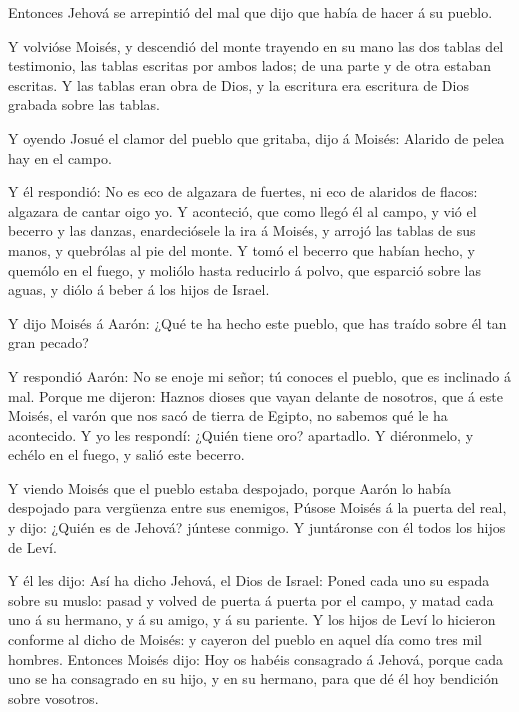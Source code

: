  Entonces Jehová se arrepintió del mal que dijo que había
de hacer á su pueblo.

 Y volvióse Moisés, y descendió del monte trayendo en su
mano las dos tablas del testimonio, las tablas escritas por ambos lados;
de una parte y de otra estaban escritas.  Y las tablas eran
obra de Dios, y la escritura era escritura de Dios grabada sobre las
tablas.

 Y oyendo Josué el clamor del pueblo que gritaba, dijo á
Moisés: Alarido de pelea hay en el campo.

 Y él respondió: No es eco de algazara de fuertes, ni eco
de alaridos de flacos: algazara de cantar oigo yo.  Y
aconteció, que como llegó él al campo, y vió el becerro y las danzas,
enardeciósele la ira á Moisés, y arrojó las tablas de sus manos, y
quebrólas al pie del monte.  Y tomó el becerro que habían
hecho, y quemólo en el fuego, y moliólo hasta reducirlo á polvo, que
esparció sobre las aguas, y diólo á beber á los hijos de Israel.

 Y dijo Moisés á Aarón: ¿Qué te ha hecho este pueblo, que
has traído sobre él tan gran pecado?

 Y respondió Aarón: No se enoje mi señor; tú conoces el
pueblo, que es inclinado á mal.  Porque me dijeron: Haznos
dioses que vayan delante de nosotros, que á este Moisés, el varón que
nos sacó de tierra de Egipto, no sabemos qué le ha acontecido.
 Y yo les respondí: ¿Quién tiene oro? apartadlo. Y
diéronmelo, y echélo en el fuego, y salió este becerro.

 Y viendo Moisés que el pueblo estaba despojado, porque
Aarón lo había despojado para vergüenza entre sus enemigos,
 Púsose Moisés á la puerta del real, y dijo: ¿Quién es de
Jehová? júntese conmigo. Y juntáronse con él todos los hijos de Leví.

 Y él les dijo: Así ha dicho Jehová, el Dios de Israel:
Poned cada uno su espada sobre su muslo: pasad y volved de puerta á
puerta por el campo, y matad cada uno á su hermano, y á su amigo, y á su
pariente.  Y los hijos de Leví lo hicieron conforme al
dicho de Moisés: y cayeron del pueblo en aquel día como tres mil
hombres.  Entonces Moisés dijo: Hoy os habéis consagrado á
Jehová, porque cada uno se ha consagrado en su hijo, y en su hermano,
para que dé él hoy bendición sobre vosotros.

